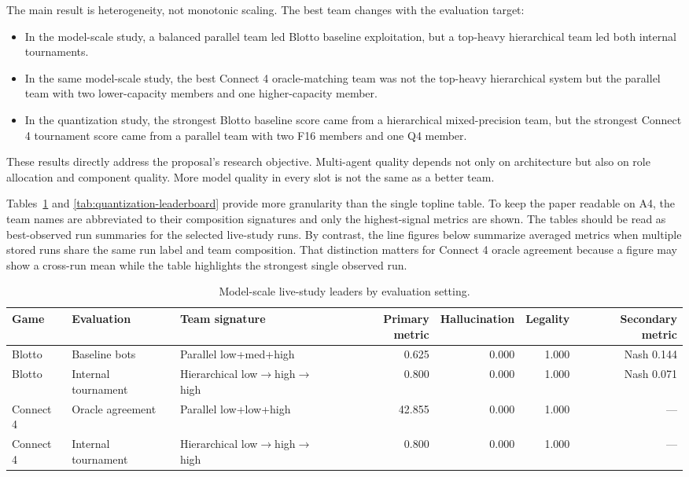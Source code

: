 \documentclass[11pt]{article}
\begin{document}
The main result is heterogeneity, not monotonic scaling. The best team changes with the evaluation target:
\begin{itemize}
  \item In the model-scale study, a balanced parallel team led Blotto baseline exploitation, but a top-heavy hierarchical team led both internal tournaments.
  \item In the same model-scale study, the best Connect 4 oracle-matching team was not the top-heavy hierarchical system but the parallel team with two lower-capacity members and one higher-capacity member.
  \item In the quantization study, the strongest Blotto baseline score came from a hierarchical mixed-precision team, but the strongest Connect 4 tournament score came from a parallel team with two F16 members and one Q4 member.
\end{itemize}

These results directly address the proposal's research objective. Multi-agent quality depends not only on architecture but also on role allocation and component quality. More model quality in every slot is not the same as a better team.

Tables~\ref{tab:model-scale-leaderboard} and \ref{tab:quantization-leaderboard} provide more granularity than the single topline table. To keep the paper readable on A4, the team names are abbreviated to their composition signatures and only the highest-signal metrics are shown.
The tables should be read as best-observed run summaries for the selected live-study runs. By contrast, the line figures below summarize averaged metrics when multiple stored runs share the same run label and team composition. That distinction matters for Connect 4 oracle agreement because a figure may show a cross-run mean while the table highlights the strongest single observed run.

\begin{table}[H]
\centering
\caption{Model-scale live-study leaders by evaluation setting.}
\label{tab:model-scale-leaderboard}
\footnotesize
\begin{adjustbox}{width=0.98\textwidth}
\begin{tabular}{@{}lllrrrr@{}}
\toprule
Game & Evaluation & Team signature & Primary metric & Hallucination & Legality & Secondary metric \\
\midrule
Blotto & Baseline bots & Parallel low+med+high & 0.625 & 0.000 & 1.000 & Nash 0.144 \\
Blotto & Internal tournament & Hierarchical low$\rightarrow$high$\rightarrow$high & 0.800 & 0.000 & 1.000 & Nash 0.071 \\
Connect 4 & Oracle agreement & Parallel low+low+high & 42.855 & 0.000 & 1.000 & --- \\
Connect 4 & Internal tournament & Hierarchical low$\rightarrow$high$\rightarrow$high & 0.800 & 0.000 & 1.000 & --- \\
\bottomrule
\end{tabular}
\end{adjustbox}
\normalsize
\end{table}
\end{document}
